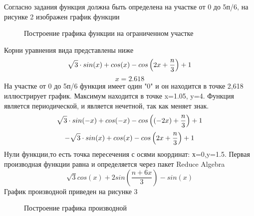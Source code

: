 \documentclass[russian,utf8,nocolumnxxxi,nocolumnxxxii]{eskdtext}
\begin{document}
Согласно задания функция должна быть определена на участке от 0 до 5п/6, на рисунке 2 изображен график функции
\begin{figure}[!ht]
    \centering
{}
\caption{Построение графика функции на ограниченном участке}
    \label{fig:my_label}
\end{figure}
Корни уравнения вида представлены ниже
\begin{equation}
\sqrt{3\mathstrut}\cdot sin(x)+cos(x)-cos\left(2x+\frac n{3}\right)+1
\end{equation}
\begin{equation}
x=2.618
\end{equation}
На участке от 0 до 5п/6 функция имеет один "0" и он находится в точке 2,618 иллюстрирует график. Максимум находится в точке x=1.05, y=4. Функция является периодической, и является нечетной, так как меняет знак.
\begin{equation}
\sqrt{3\mathstrut}\cdot sin(-x)+cos(-x)-cos\left((-2x)+\frac n{3}\right)+1
\end{equation}
\begin{equation}
-\sqrt{3\mathstrut}\cdot sin(x)+cos(x)-cos\left(2x+\frac n{3}\right)+1
\end{equation}
Нули функции,то есть точка пересечения с осями координат: х=0,y=1.5.
Первая производная функции равна и определяется через пакет Reduce Algebra
\begin{equation}
\sqrt3cos(x)+2sin\left(\frac{n+6x}{3}\right)-sin(x)
\end{equation}
График производной приведен на рисунке 3 %
\begin{figure}[!ht]
    \centering
{}
\caption{Построение графика производной}
\label{fig:my_label}
\end{figure}
\end{document}
